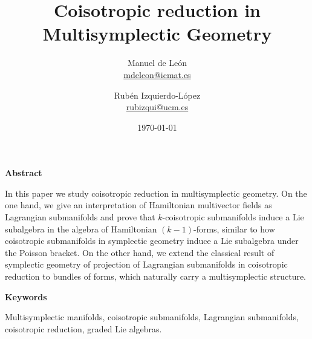 \documentclass[12pt]{article}
\newenvironment{keywords}
{
\begin{center}
\textbf{Keywords}\\
\vspace{0.17cm}
\begin{minipage}{14.5cm}}
{\footnotesize
\end{minipage}
\end{center}}
\newenvironment{Abstract}
{
\begin{center}
\textbf{Abstract}\\
\vspace{0.25cm}
\begin{minipage}{14.5cm}}
{\footnotesize
\end{minipage}
\end{center}}
\newcommand{\mail}[1]{\small\href{mailto:#1}{#1}}
\theoremstyle{definition}
\begin{document}
\title{\huge Coisotropic reduction in Multisymplectic Geometry}

\author{Manuel de León  \\ \mail{mdeleon@icmat.es}}

\author{Rubén Izquierdo-López  \\ \mail{rubizqui@ucm.es}}

\date{\today}

\maketitle

\begin{Abstract}
In this paper we study coisotropic reduction in multisymplectic geometry. On the one hand, we give an interpretation of Hamiltonian multivector fields as Lagrangian submanifolds and prove that $k$-coisotropic submanifolds induce a Lie subalgebra in the algebra of Hamiltonian $(k-1)$-forms, similar to how coisotropic submanifolds in symplectic geometry induce a Lie subalgebra under the Poisson bracket. On the other hand, we extend the classical result of symplectic geometry of projection of Lagrangian submanifolds in coisotropic reduction to bundles of forms, which naturally carry a multisymplectic structure.
\end{Abstract}

\begin{keywords}
Multisymplectic manifolds, coisotropic submanifolds, Lagrangian submanifolds, coisotropic reduction, graded Lie algebras.
\end{keywords}


\tableofcontents
\end{document}
